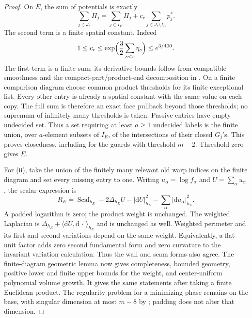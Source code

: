 \documentclass[11pt]{article}
\numberwithin{equation}{section}
\theoremstyle{definition}
\theoremstyle{remark}
\begin{document}
\begin{proof}
On $E$, the sum of potentials is exactly
\begin{equation}\label{countable:potential-sum}
 \sum_{j\in J_r}\Pi_j
 =\sum_{j\in I_E}\Pi_j+c_r\sum_{j\in J_r\setminus I_E}p_j^*.
\end{equation}
The second term is a finite spatial constant. Indeed
\[
 1\le c_r\le\exp\Bigl(\frac32\sum_{s<r}\eta_s\Bigr)
 \le e^{3/400}.
\]
The first term is a finite sum; its derivative bounds follow from
compatible smoothness and the compact-part/product-end decomposition
in . On a finite comparison diagram choose common
product thresholds for its finite exceptional list. Every other entry is already a spatial
constant with the same value on each copy. The full sum is therefore
an exact face pullback beyond those thresholds; no supremum of
infinitely many thresholds is taken. Passive entries have empty
undecided set. Thus a set requiring at least $a\ge1$ undecided labels
is the finite union, over $a$-element subsets of $I_E$, of the intersections of
their closed $G_j$'s. This proves closedness, including for the guards
with threshold $m-2$. Threshold zero gives $E$.

For (ii), take the union of the finitely many relevant old warp
indices on the finite diagram and set every missing entry to one.
Writing $u_\alpha=\log f_\alpha$ and $U=\sum_\alpha u_\alpha$, the
scalar expression is
\[
 R_E=\operatorname{Scal}_{h_E}-2\Delta_{h_E}U-|\mathrm d U|_{h_E}^2
                        -\sum_\alpha|\mathrm d u_\alpha|_{h_E}^2.
\]
A padded logarithm is zero; the product weight is unchanged. The
weighted Laplacian is
$\Delta_{h_E}+\langle\mathrm d U,\mathrm d\,\cdot\,\rangle_{h_E}$ and is
unchanged as well. Weighted perimeter and its first and second
variations depend on the same weight. Equivalently, a flat unit
factor adds zero second fundamental form and zero curvature to the
invariant variation calculation. Thus the wall and seam forms also
agree. The finite-diagram geometric lemma now gives completeness,
bounded geometry, positive lower and finite upper bounds for the
weight, and center-uniform polynomial volume growth. It gives the
same statements after taking a finite Euclidean product. The
regularity problem for a minimizing phase remains on the base, with
singular dimension at most $m-8$ by ; padding does not
alter that dimension.


\end{proof}
\end{document}
